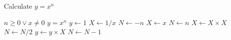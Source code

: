 \documentclass{article}
\begin{document}
\begin{algorithm}
    \caption{Calculate $y = x^n$}
    \begin{algorithmic} 
        \REQUIRE $n \geq 0 \vee x \neq 0$
        \ENSURE $y = x^n$
        \STATE $y \leftarrow 1$
        \STATE $X \leftarrow 1 / x$
        \STATE $N \leftarrow -n$
        \ELSE
        \STATE $X \leftarrow x$
        \STATE $N \leftarrow n$
        \ENDIF
        \STATE $X \leftarrow X \times X$
        \STATE $N \leftarrow N / 2$
        \ELSE[$N$ is odd]
        \STATE $y \leftarrow y \times X$
        \STATE $N \leftarrow N - 1$
        \ENDIF
        \ENDWHILE
    \end{algorithmic}
\end{algorithm}
\end{document}
